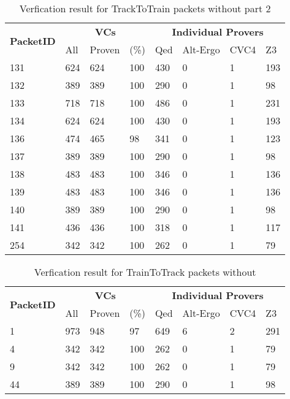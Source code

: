 \begin{table}[hbt]
\begin{center}
    \begin{tabular}{|m{10ex}|m{5ex}m{5ex}m{5ex}|m{5ex}m{5ex}m{5ex}m{5ex}|}
\hline
\multirow{2}{*}{\textbf{PacketID}} &
\multicolumn{3}{c|}{ \textbf{VCs}} &
\multicolumn{4}{c|}{\textbf{Individual Provers}}\\
\cline{2-8}
               &  All & Proven & (\%) & Qed & Alt-Ergo & CVC4 & Z3  \\
\hline
\hline
131 & 624 & 624 & 100 & 430 & 0 & 1 & 193\\
\hline
132 & 389 & 389 & 100 & 290 & 0 & 1 & 98\\
\hline
133 & 718 & 718 & 100 & 486 & 0 & 1 & 231\\
\hline
134 & 624 & 624 & 100 & 430 & 0 & 1 & 193\\
\hline
136 & 474 & 465 & 98 & 341 & 0 & 1 & 123\\
\hline
137 & 389 & 389 & 100 & 290 & 0 & 1 & 98\\
\hline
138 & 483 & 483 & 100 & 346 & 0 & 1 & 136\\
\hline
139 & 483 & 483 & 100 & 346 & 0 & 1 & 136\\
\hline
140 & 389 & 389 & 100 & 290 &  0 &  1 & 98\\
\hline
141 & 436 & 436 & 100 & 318 & 0 & 1 & 117\\
\hline
254 & 342 & 342 & 100 &262 & 0 & 1 & 79\\
\hline
\end{tabular}
\end{center}
\caption{\label{tbl:packets-without-niter-tracktotrain-part2} Verfication result for TrackToTrain packets without  part 2}
\end{table}

\FloatBarrier  %

\begin{table}[hbt]
\begin{center}
    \begin{tabular}{|m{10ex}|m{5ex}m{5ex}m{5ex}|m{5ex}m{5ex}m{5ex}m{5ex}|}
\hline
\multirow{2}{*}{\textbf{PacketID}} &
\multicolumn{3}{c|}{ \textbf{VCs}} &
\multicolumn{4}{c|}{\textbf{Individual Provers}}\\
\cline{2-8}
               &  All & Proven & (\%) & Qed & Alt-Ergo & CVC4 & Z3  \\
\hline
\hline
1 & 973 & 948 & 97 & 649 & 6 & 2 & 291\\
\hline
4 & 342 & 342 & 100 & 262 & 0 & 1 & 79\\
\hline
9 & 342 & 342 & 100 & 262 & 0 & 1 & 79\\
\hline
44 & 389 & 389 & 100 & 290 & 0 & 1 & 98\\
\hline
\end{tabular}
\end{center}
\caption{\label{tbl:packets-without-niter-traintotrack} Verfication result for TrainToTrack packets without }
\end{table}

